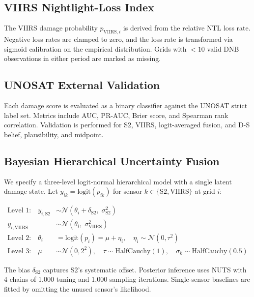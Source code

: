 \documentclass[wcp]{jmlr}
\begin{document}
\subsection{VIIRS Nightlight-Loss Index}

The VIIRS damage probability $p_{\text{VIIRS},i}$ is derived from the
relative NTL loss rate. Negative loss rates are clamped to zero, and the
loss rate is transformed via sigmoid calibration on the empirical
distribution. Grids with $<10$ valid DNB observations in either period are
marked as missing.

\subsection{UNOSAT External Validation}

Each damage score is evaluated as a binary classifier against the UNOSAT
strict label set. Metrics include AUC, PR-AUC, Brier score, and Spearman
rank correlation. Validation is performed for S2, VIIRS, logit-averaged
fusion, and D-S belief, plausibility, and midpoint.

\subsection{Bayesian Hierarchical Uncertainty Fusion}\label{sec:bayes}

We specify a three-level logit-normal hierarchical model with a single
latent damage state. Let $y_{ik} = \text{logit}(p_{ik})$ for sensor
$k \in \{\text{S2}, \text{VIIRS}\}$ at grid $i$:

\begin{align}
\text{Level 1:}\quad
  y_{i,\text{S2}} &\sim \mathcal{N}(\theta_i + \delta_{\text{S2}},\;
                     \sigma_{\text{S2}}^2) \label{eq:L1s2}\\
  y_{i,\text{VIIRS}} &\sim \mathcal{N}(\theta_i,\;
                         \sigma_{\text{VIIRS}}^2) \label{eq:L1v}\\
\text{Level 2:}\quad
  \theta_i &= \text{logit}(p_i) = \mu + \eta_i,\quad
  \eta_i \sim \mathcal{N}(0, \tau^2) \label{eq:L2}\\
\text{Level 3:}\quad
  \mu &\sim \mathcal{N}(0, 2^2),\quad
  \tau \sim \text{HalfCauchy}(1),\quad
  \sigma_k \sim \text{HalfCauchy}(0.5) \label{eq:L3}
\end{align}

The bias $\delta_{\text{S2}}$ captures S2's systematic offset. Posterior
inference uses NUTS with 4 chains of 1{,}000 tuning and 1{,}000 sampling
iterations. Single-sensor baselines are fitted by omitting the unused
sensor's likelihood.
\end{document}
